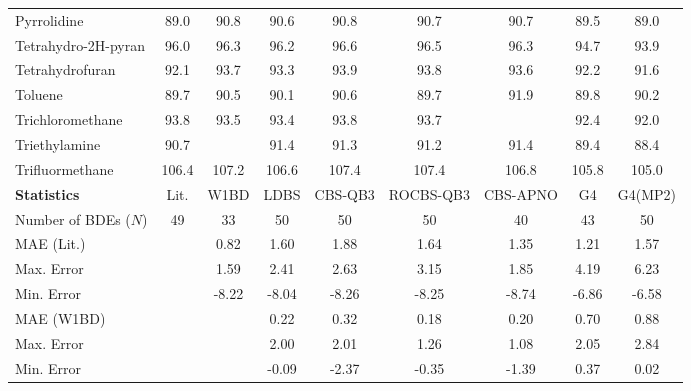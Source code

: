 \begin{longtable}{m{3.1cm} | c c c c c c c c}
Pyrrolidine                      &  89.0     &   90.8   &   90.6   &    90.8     &    90.7    &   90.7   &  89.5   &    89.0   \\
Tetrahydro-2H-pyran              &  96.0     &   96.3   &   96.2   &    96.6     &    96.5    &   96.3   &  94.7   &    93.9   \\
Tetrahydrofuran                  &  92.1     &   93.7   &   93.3   &    93.9     &    93.8    &   93.6   &  92.2   &    91.6   \\
Toluene                          &  89.7     &   90.5   &   90.1   &    90.6     &    89.7    &   91.9   &  89.8   &    90.2   \\
Trichloromethane                 &  93.8     &   93.5   &   93.4   &    93.8     &    93.7    &          &  92.4   &    92.0   \\
Triethylamine                    &  90.7     &          &   91.4   &    91.3     &    91.2    &   91.4   &  89.4   &    88.4   \\
Trifluormethane                  & 106.4     &  107.2   &  106.6   &   107.4     &   107.4    &  106.8   & 105.8   &   105.0   \\
\hline
\textbf{Statistics}              & Lit.      &  W1BD    &    LDBS  &    CBS-QB3  &  ROCBS-QB3 & CBS-APNO &    G4   &   G4(MP2) \\
\hline
Number of BDEs ($N$)             &    49     &     33   &     50   &     50      &      50    &     40   &    43   &      50   \\
MAE (Lit.)                       &           &   0.82   &   1.60   &    1.88     &    1.64    &   1.35   &  1.21   &    1.57   \\
Max. Error                       &           &   1.59   &   2.41   &    2.63     &    3.15    &   1.85   &  4.19   &    6.23   \\
Min. Error                       &           &  -8.22   &  -8.04   &   -8.26     &   -8.25    &  -8.74   & -6.86   &   -6.58   \\
MAE (W1BD)                       &           &          &   0.22   &    0.32     &    0.18    &   0.20   &  0.70   &    0.88   \\
Max. Error                       &           &          &   2.00   &    2.01     &    1.26    &   1.08   &  2.05   &    2.84   \\
Min. Error                       &           &          &  -0.09   &   -2.37     &   -0.35    &  -1.39   &  0.37   &    0.02   \\
\end{longtable}
